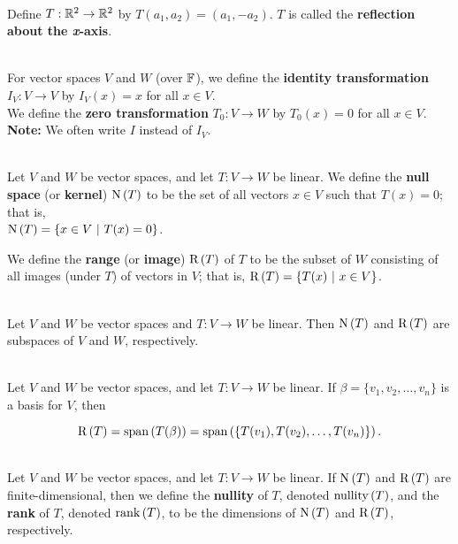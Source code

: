 \begin{definition}
	\hfill\\
	Define $T: \mathbb{R}^2 \to \mathbb{R}^2$ by $T(a_1, a_2) = (a_1, -a_2)$. $T$ is called the \textbf{reflection about the \textit{x}-axis}.
\end{definition}

\begin{definition}
	\hfill\\
	For vector spaces $V$ and $W$ (over $\mathbb{F}$), we define the \textbf{identity transformation} $I_V: V \to V$ by $I_V(x) = x$ for all $x \in V$.\\
	
	We define the \textbf{zero transformation} $T_0: V \to W$ by $T_0(x) = 0$ for all $x \in V$.\\
	
	\textbf{Note:} We often write $I$ instead of $I_V$.
\end{definition}

\begin{definition}
	\hfill\\
	Let $V$ and $W$ be vector spaces, and let $T: V \to W$ be linear. We define the \textbf{null space} (or \textbf{kernel}) $\text{N}\left(T\right)$ to be the set of all vectors $x \in V$ such that $T(x)=0$; that is, \\$\text{N}\left(T\right) = \{x \in V\ |\ T(x) = 0\}$.
	
	We define the \textbf{range} (or \textbf{image}) $\text{R}\left(T\right)$ of $T$ to be the subset of $W$ consisting of all images (under $T$) of vectors in $V$; that is, $\text{R}\left(T\right) = \{T(x)\ |\ x \in V\}$.
\end{definition}

\begin{theorem}
	\hfill\\
	Let $V$ and $W$ be vector spaces and $T: V \to W$ be linear. Then $\text{N}\left(T\right)$ and $\text{R}\left(T\right)$ are subspaces of $V$ and $W$, respectively.
\end{theorem}

\begin{theorem}
	\hfill\\
	Let $V$ and $W$ be vector spaces, and let $T: V \to W$ be linear. If $\beta = \{v_1, v_2, \dots, v_n\}$ is a basis for $V$, then
	
	\[\text{R}\left(T\right) = \text{span}\left(T(\beta)\right) = \text{span}\left(\{T(v_1), T(v_2), \dots, T(v_n)\}\right).\]
\end{theorem}

\begin{definition}
	\hfill\\
	Let $V$ and $W$ be vector spaces, and let $T: V \to W$ be linear. If $\text{N}\left(T\right)$ and $\text{R}\left(T\right)$ are finite-dimensional, then we define the \textbf{nullity} of $T$, denoted $\text{nullity}\left(T\right)$, and the \textbf{rank} of $T$, denoted $\text{rank}\left(T\right)$, to be the dimensions of $\text{N}\left(T\right)$ and $\text{R}\left(T\right)$, respectively.
\end{definition}

